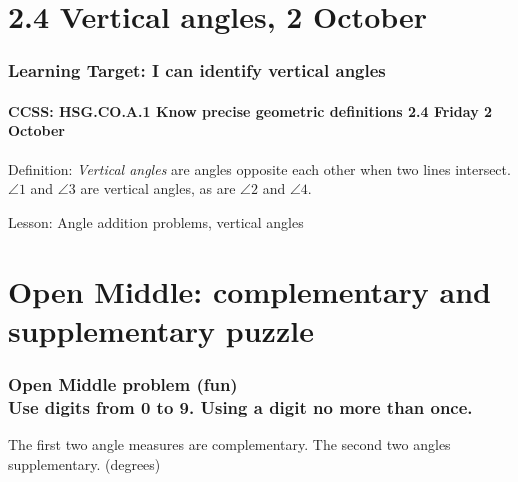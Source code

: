 \documentclass{beamer}
\begin{document}
\section{2.4 Vertical angles, 2 October}
\frame
{
  \frametitle{Learning Target: I can identify vertical angles}
  \framesubtitle{CCSS: HSG.CO.A.1 Know precise geometric definitions  \hfill \alert{2.4 Friday 2 October}}

  Definition: \emph{Vertical angles} are angles opposite each other when two lines intersect. $\angle 1$ and $\angle 3$ are vertical angles, as are $\angle 2$ and $\angle 4$.
\begin{center}
\end{center}
  Lesson: Angle addition problems, vertical angles
}

\section{Open Middle: complementary and supplementary puzzle}
\frame
{
  \frametitle{Open Middle problem (fun) \\
  Use digits from 0 to 9. Using a digit no more than once.}
    The first two angle measures are complementary. The second two angles supplementary. (degrees)\\[0.75cm]
       \vspace{5cm} 
}
\end{document}
